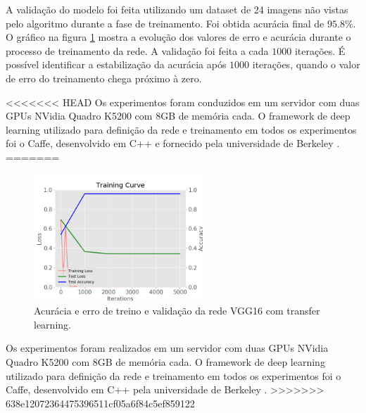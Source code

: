 \documentclass[conference]{IEEEtran}
\begin{document}
  A validação do modelo foi feita utilizando um dataset de 24 imagens não vistas pelo algoritmo durante a fase de treinamento. Foi obtida acurácia final de $95.8\%$. O gráfico na figura \ref{fig:acuracia_vgg16_transfer} mostra a evolução dos valores de erro e acurácia durante o processo de treinamento da rede. A validação foi feita a cada $1000$ iterações. É possível identificar a estabilização da acurácia após $1000$ iterações, quando o valor de erro do treinamento chega próximo à zero.

<<<<<<< HEAD
  Os experimentos foram conduzidos em um servidor com duas GPUs NVidia Quadro K5200 com 8GB de memória cada. O framework de deep learning utilizado para definição da rede e treinamento em todos os experimentos foi o Caffe, desenvolvido em C++ e fornecido pela universidade de Berkeley \cite{jia2014caffe}.
=======
  \begin{figure}[!tp]
    \centering
    \includegraphics[width=2.5in]{img/curve_vgg16.png}
    \caption{Acurácia e erro de treino e validação da rede VGG16 com transfer learning.}
    \label{fig:acuracia_vgg16_transfer}
  \end{figure}

  Os experimentos foram realizados em um servidor com duas GPUs NVidia Quadro K5200 com 8GB de memória cada. O framework de deep learning utilizado para definição da rede e treinamento em todos os experimentos foi o Caffe, desenvolvido em C++ pela universidade de Berkeley \cite{jia2014caffe}.
>>>>>>> 638e12072364475396511cf05a6f84c5ef859122


\end{document}
